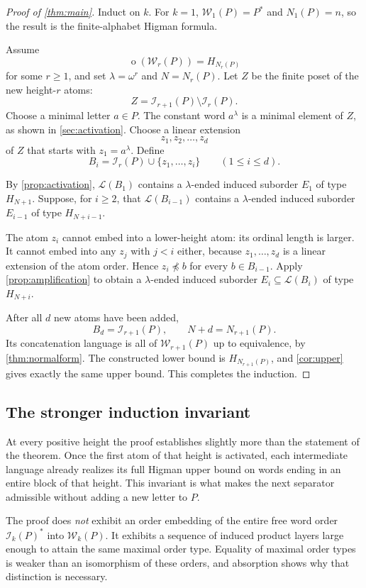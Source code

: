 \documentclass[11pt,letterpaper]{article}
\theoremstyle{definition}
\theoremstyle{remark}
\newcommand{\W}{\mathcal W}
\newcommand{\I}{\mathcal I}
\newcommand{\Lcal}{\mathcal L}
\newcommand{\otp}{\operatorname{o}}
\newcommand{\nemb}{\npreccurlyeq}
\begin{document}
\begin{proof}[Proof of \cref{thm:main}]
Induct on $k$. For $k=1$, $\W_1(P)=P^*$ and $N_1(P)=n$, so the result
is the finite-alphabet Higman formula.

Assume
\[
  \otp(\W_r(P))=H_{N_r(P)}
\]
for some $r\ge1$, and set $\lambda=\omega^r$ and $N=N_r(P)$.
Let $Z$ be the finite poset of the new height-$r$ atoms:
\[
  Z=\I_{r+1}(P)\setminus\I_r(P).
\]
Choose a minimal letter $a\in P$. The constant word $a^\lambda$ is a
minimal element of $Z$, as shown in \cref{sec:activation}. Choose a linear
extension
\[
  z_1,z_2,\ldots,z_d
\]
of $Z$ that starts with $z_1=a^\lambda$.
Define
\[
  B_i=\I_r(P)\cup\{z_1,\ldots,z_i\}\qquad(1\le i\le d).
\]

By \cref{prop:activation}, $\Lcal(B_1)$ contains a $\lambda$-ended induced
suborder $E_1$ of type $H_{N+1}$. Suppose, for $i\ge2$, that
$\Lcal(B_{i-1})$ contains a $\lambda$-ended induced suborder $E_{i-1}$
of type $H_{N+i-1}$.

The atom $z_i$ cannot embed into a lower-height atom: its ordinal length
is larger. It cannot embed into any $z_j$ with $j<i$ either, because
$z_1,\ldots,z_d$ is a linear extension of the atom order. Hence
$z_i\nemb b$ for every $b\in B_{i-1}$.
Apply \cref{prop:amplification} to obtain a $\lambda$-ended induced
suborder $E_i\subseteq\Lcal(B_i)$ of type $H_{N+i}$.

After all $d$ new atoms have been added,
\[
  B_d=\I_{r+1}(P),\qquad N+d=N_{r+1}(P).
\]
Its concatenation language is all of $\W_{r+1}(P)$ up to equivalence,
by \cref{thm:normalform}. The constructed lower bound is
$H_{N_{r+1}(P)}$, and \cref{cor:upper} gives exactly the same upper bound.
This completes the induction.
\end{proof}

\subsection{The stronger induction invariant}

At every positive height the proof establishes slightly more than the
statement of the theorem. Once the first atom of that height is activated,
each intermediate language already realizes its full Higman upper bound
on words ending in an entire block of that height. This invariant is
what makes the next separator admissible without adding a new letter to
$P$.

The proof does \emph{not} exhibit an order embedding of the entire free
word order $\I_k(P)^*$ into $\W_k(P)$. It exhibits a sequence of induced
product layers large enough to attain the same maximal order type.
Equality of maximal order types is weaker than an isomorphism of these
orders, and absorption shows why that distinction is necessary.
\end{document}
